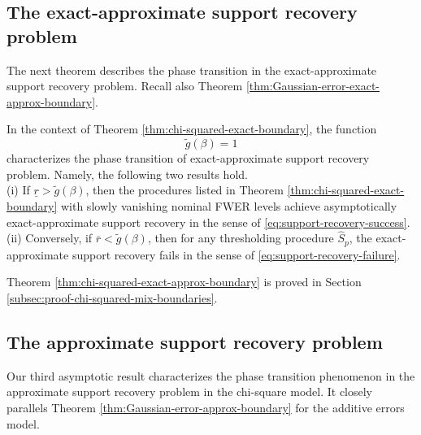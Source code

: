 \subsection{The exact-approximate support recovery problem}
\label{subsec:exact-approx-support-recovery-chisq}

The next theorem describes the phase transition in the exact-approximate support recovery problem. Recall also
Theorem \ref{thm:Gaussian-error-exact-approx-boundary}.

\begin{theorem} \label{thm:chi-squared-exact-approx-boundary}
In the context of Theorem \ref{thm:chi-squared-exact-boundary}, 
the function 
\begin{equation} \label{eq:exact-approx-boundary-chisquared}
    \widetilde{g}(\beta) = 1
\end{equation}
characterizes the phase transition of exact-approximate support recovery problem.
 Namely, the following two results hold.\\

{\rm (i)} If $\underline{r} > \widetilde{g}(\beta)$, then the procedures listed in Theorem \ref{thm:chi-squared-exact-boundary} with slowly 
vanishing nominal FWER levels achieve asymptotically exact-approximate support recovery in the sense of \eqref{eq:support-recovery-success}. \\

{\rm (ii)} Conversely, if $\overline{r} < \widetilde{g}(\beta)$, then for any thresholding procedure $\widehat{S}_p$, the exact-approximate support recovery fails in the sense of \eqref{eq:support-recovery-failure}.
\end{theorem}

Theorem \ref{thm:chi-squared-exact-approx-boundary} is proved in Section \ref{subsec:proof-chi-squared-mix-boundaries}. 


\subsection{The approximate support recovery problem}
\label{subsec:approx-support-recovery-chisq}

Our third asymptotic result characterizes the phase transition phenomenon in the approximate support recovery problem in the chi-square model.
It closely parallels Theorem \ref{thm:Gaussian-error-approx-boundary} for the additive errors model.

